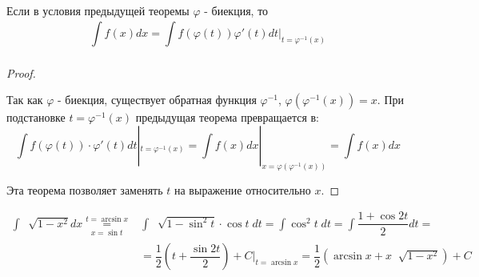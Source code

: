 \documentclass[../main.tex]{subfiles}
\begin{document}
\begin{crl}
    Если в условия предыдущей теоремы \( \varphi \) - биекция, то 
    \[ \displaystyle\int\limits_{ }^{ } f\left( x\right)dx= \displaystyle\int\limits_{ }^{ } f\left( \varphi \left( t\right)\right) \varphi '\left( t\right)dt|_{t= \varphi ^{-1}\left( x\right)}\]
\end{crl}
\begin{proof}
    
    ~

    Так как \( \varphi \) - биекция, существует обратная функция \( \varphi ^{-1}\), \( \varphi \left( \varphi ^{-1}\left( x\right)\right)=x\). При подстановке \( t = \varphi ^{-1}\left( x\right)\) предыдущая теорема превращается в:
    \[ \displaystyle\int\limits_{ }^{ } f\left( \varphi \left( t\right)\right) \cdot \varphi '\left( t\right)dt|_{t= \varphi ^{-1}\left( x\right)}= \displaystyle\int\limits_{ }^{ } f\left( x\right)dx|_{x= \varphi \left( \varphi ^{-1}\left( x\right)\right)}= \displaystyle\int\limits_{ }^{ } f\left( x\right)dx\]

    Эта теорема позволяет заменять \( t\) на выражение относительно \( x\).
\end{proof}

\begin{example}
    \begin{equation*}
        \begin{aligned}
            \displaystyle\int\limits_{ }^{ } \;\sqrt[]{1-x^2}dx\underset{x=\sin t}{\overset{t=\arcsin x}{=}}& \displaystyle\int\limits_{ }^{ } \;\sqrt[]{1-\sin^2t} \cdot \cos t\;dt= \displaystyle\int\limits_{ }^{ } \cos ^2t\;dt= \displaystyle\int\limits_{ }^{ } \dfrac{ 1+\cos2t}{ 2} dt=\\
            &= \dfrac{ 1}{ 2} \left( t+ \dfrac{ \sin2t}{ 2} \right)+C|_{t=\arcsin x}= \dfrac{ 1}{ 2} \left( \arcsin x+ x \;\sqrt[]{1-x^2}\right)+C
        \end{aligned}
    \end{equation*}
\end{example}
\end{document}
